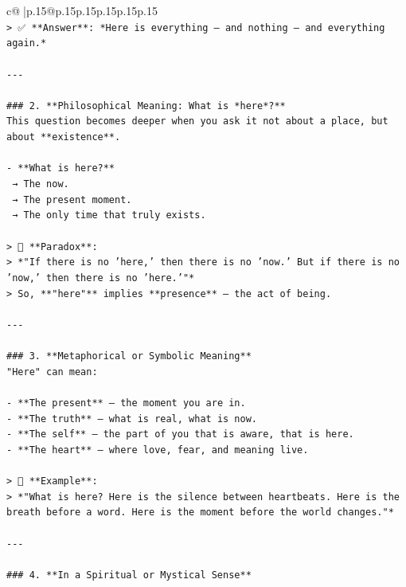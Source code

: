 \documentclass{article}
\begin{document}
{\begin{supertabular}{c@{$\;$}|p{.15\linewidth}@{}p{.15\linewidth}p{.15\linewidth}p{.15\linewidth}p{.15\linewidth}p{.15\linewidth}}
{{{\\ 
\texttt{> ✅ **Answer**: *Here is everything — and nothing — and everything again.*} \\
\\ 
\texttt{{-}{-}{-}} \\
\\ 
\texttt{\#\#\# 2. **Philosophical Meaning: What is *here*?**  } \\
\texttt{This question becomes deeper when you ask it not about a place, but about **existence**.} \\
\\ 
\texttt{{-} **What is here?**  } \\
\texttt{  → The now.  } \\
\texttt{  → The present moment.  } \\
\texttt{  → The only time that truly exists.} \\
\\ 
\texttt{> 🤯 **Paradox**:  } \\
\texttt{> *"If there is no 'here,' then there is no 'now.' But if there is no 'now,' then there is no 'here.'"*  } \\
\texttt{> So, **"here"** implies **presence** — the act of being.} \\
\\ 
\texttt{{-}{-}{-}} \\
\\ 
\texttt{\#\#\# 3. **Metaphorical or Symbolic Meaning**  } \\
\texttt{"Here" can mean:} \\
\\ 
\texttt{{-} **The present** — the moment you are in.  } \\
\texttt{{-} **The truth** — what is real, what is now.  } \\
\texttt{{-} **The self** — the part of you that is aware, that is here.  } \\
\texttt{{-} **The heart** — where love, fear, and meaning live.} \\
\\ 
\texttt{> 🌌 **Example**:  } \\
\texttt{> *"What is here? Here is the silence between heartbeats. Here is the breath before a word. Here is the moment before the world changes."*} \\
\\ 
\texttt{{-}{-}{-}} \\
\\ 
\texttt{\#\#\# 4. **In a Spiritual or Mystical Sense**  } \\
}}}
\end{supertabular}}
\end{document}
